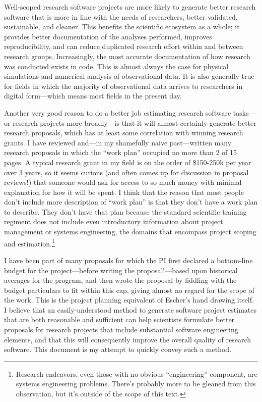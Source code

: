 \documentclass[12pt,oneside]{book}
\begin{document}
Well-scoped research software projects are more likely to generate better research software that is more in line with the needs of researchers, better validated, sustainable, and cleaner. This benefits the scientific ecosystem as a whole; it provides better documentation of the analyses performed, improves reproducibility, and can reduce duplicated research effort within and between research groups. Increasingly, the most accurate documentation of how research was conducted exists in code. This is almost always the case for physical simulations and numerical analysis of observational data. It is also generally true for fields in which the majority of observational data arrives to researchers in digital form---which means most fields in the present day.

Another very good reason to do a better job estimating research software tasks---or research projects more broadly---is that it will almost certainly generate better research proposals, which has at least some correlation with winning research grants. I have reviewed and---in my shamefully naive past---written many research proposals in which the ``work plan'' occupied no more than 2 of 15 pages. A typical research grant in my field is on the order of \$150-250k per year over 3 years, so it seems curious (and often comes up for discussion in proposal reviews!) that someone would ask for access to so much money with minimal explanation for how it will be spent. I think that the reason that most people don't include more description of ``work plan'' is that they don't have a work plan to describe. They don't have that plan because the standard scientific training regiment does not include even introductory information about project management or systems engineering, the domains that encompass project scoping and estimation.\footnote{
Research endeavors, even those with no obvious “engineering” component, are systems engineering problems. There’s probably more to be gleaned from this observation, but it’s outside of the scope of this text.}

I have been part of many proposals for which the PI first declared a bottom-line budget for the project---before writing the proposal!---based upon historical averages for the program, and then wrote the proposal by fiddling with the budget particulars to fit within this cap, giving almost no regard for the scope of the work. This is the project planning equivalent of Escher's hand drawing itself. I believe that an easily-understood method to generate software project estimates that are both reasonable and sufficient can help scientists formulate better proposals for research projects that include substantial software engineering elements, and that this will consequently improve the overall quality of research software. This document is my attempt to quickly convey such a method.
\end{document}
